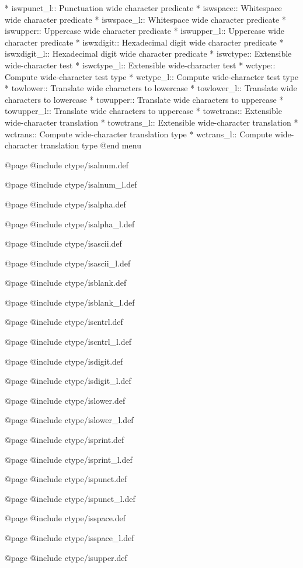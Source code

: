 * iswpunct_l::  Punctuation wide character predicate
* iswspace::  Whitespace wide character predicate
* iswspace_l::  Whitespace wide character predicate
* iswupper::  Uppercase wide character predicate
* iswupper_l::  Uppercase wide character predicate
* iswxdigit:: Hexadecimal digit wide character predicate
* iswxdigit_l:: Hexadecimal digit wide character predicate
* iswctype::  Extensible wide-character test
* iswctype_l::  Extensible wide-character test
* wctype::    Compute wide-character test type
* wctype_l::    Compute wide-character test type
* towlower::  Translate wide characters to lowercase
* towlower_l::  Translate wide characters to lowercase
* towupper::  Translate wide characters to uppercase
* towupper_l::  Translate wide characters to uppercase
* towctrans:: Extensible wide-character translation
* towctrans_l:: Extensible wide-character translation
* wctrans::   Compute wide-character translation type
* wctrans_l::   Compute wide-character translation type
@end menu

@page
@include ctype/isalnum.def

@page
@include ctype/isalnum_l.def

@page
@include ctype/isalpha.def

@page
@include ctype/isalpha_l.def

@page
@include ctype/isascii.def

@page
@include ctype/isascii_l.def

@page
@include ctype/isblank.def

@page
@include ctype/isblank_l.def

@page
@include ctype/iscntrl.def

@page
@include ctype/iscntrl_l.def

@page
@include ctype/isdigit.def

@page
@include ctype/isdigit_l.def

@page
@include ctype/islower.def

@page
@include ctype/islower_l.def

@page
@include ctype/isprint.def

@page
@include ctype/isprint_l.def

@page
@include ctype/ispunct.def

@page
@include ctype/ispunct_l.def

@page
@include ctype/isspace.def

@page
@include ctype/isspace_l.def

@page
@include ctype/isupper.def

